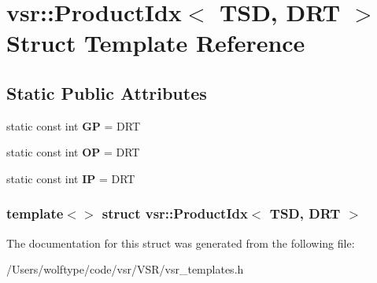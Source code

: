 \hypertarget{structvsr_1_1_product_idx_3_01_t_s_d_00_01_d_r_t_01_4}{\section{vsr\-:\-:Product\-Idx$<$ T\-S\-D, D\-R\-T $>$ Struct Template Reference}
\label{structvsr_1_1_product_idx_3_01_t_s_d_00_01_d_r_t_01_4}
}
\subsection*{Static Public Attributes}
\begin{DoxyCompactItemize}
\item 
\hypertarget{structvsr_1_1_product_idx_3_01_t_s_d_00_01_d_r_t_01_4_a4642b48f9fdc1a22cd8ef446c9b3a455}{static const int {\bfseries G\-P} = D\-R\-T}\label{structvsr_1_1_product_idx_3_01_t_s_d_00_01_d_r_t_01_4_a4642b48f9fdc1a22cd8ef446c9b3a455}

\item 
\hypertarget{structvsr_1_1_product_idx_3_01_t_s_d_00_01_d_r_t_01_4_aa140db130c01e4a2df13c60919a04272}{static const int {\bfseries O\-P} = D\-R\-T}\label{structvsr_1_1_product_idx_3_01_t_s_d_00_01_d_r_t_01_4_aa140db130c01e4a2df13c60919a04272}

\item 
\hypertarget{structvsr_1_1_product_idx_3_01_t_s_d_00_01_d_r_t_01_4_ac554d3d1a8e45b626bea67fdb6f77422}{static const int {\bfseries I\-P} = D\-R\-T}\label{structvsr_1_1_product_idx_3_01_t_s_d_00_01_d_r_t_01_4_ac554d3d1a8e45b626bea67fdb6f77422}

\end{DoxyCompactItemize}
\subsubsection*{template$<$$>$ struct vsr\-::\-Product\-Idx$<$ T\-S\-D, D\-R\-T $>$}



The documentation for this struct was generated from the following file\-:\begin{DoxyCompactItemize}
\item 
/\-Users/wolftype/code/vsr/\-V\-S\-R/vsr\-\_\-templates.\-h\end{DoxyCompactItemize}
